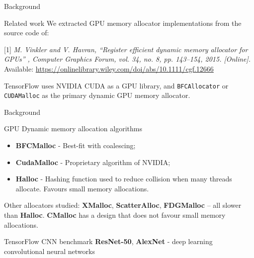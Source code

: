 \documentclass[10pt]{beamer}
\begin{document}
\begin{frame}[fragile]{Background}


\begin{exampleblock}{Related work}
We extracted GPU memory allocator implementations from the source code of:

[1] \textit{M. Vinkler and V. Havran, “Register efficient dynamic memory allocator for GPUs” , Computer Graphics Forum, vol. 34, no. 8, pp. 143–154, 2015. [Online].} Available: \url{https://onlinelibrary.wiley.com/doi/abs/10.1111/cgf.12666}

TensorFlow uses NVIDIA CUDA as a GPU library, and \texttt{BFCAllocator} or \texttt{CUDAMalloc} as the primary dynamic GPU memory allocator.
\end{exampleblock}
\end{frame}

\begin{frame}[fragile]{Background}


\begin{alertblock}{GPU Dynamic memory allocation algorithms}
 \begin{itemize}
     \item \textbf{BFCMalloc} - Best-fit with coalescing;
     \item \textbf{CudaMalloc} - Proprietary algorithm of NVIDIA;
     \item \textbf{Halloc} - Hashing function used to reduce collision when many threads allocate. Favours small memory allocations.
 \end{itemize}
 Other allocators studied: \textbf{XMalloc}, \textbf{ScatterAlloc}, \textbf{FDGMalloc} -- all slower than \textbf{Halloc}. \textbf{CMalloc} has a design that does not favour small memory allocations.
\end{alertblock}

\begin{exampleblock}{TensorFlow CNN benchmark}
    \textbf{ResNet-50}, \textbf{AlexNet} - deep learning convolutional neural networks
\end{exampleblock}

\end{frame}

\end{document}
